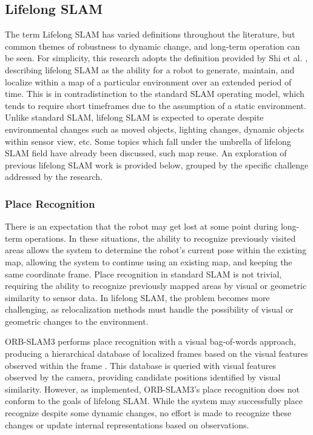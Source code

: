 \subsection{Lifelong SLAM}

The term Lifelong SLAM has varied definitions throughout the literature, but common themes of robustness to dynamic change, and long-term operation can be seen. For simplicity, this research adopts the definition provided by Shi et al. \cite{shiAreWeReady2020}, describing lifelong SLAM as the ability for a robot to generate, maintain, and localize within a map of a particular environment over an extended period of time. This is in contradistinction to the standard SLAM operating model, which tends to require short timeframes due to the assumption of a static environment. Unlike standard SLAM, lifelong SLAM is expected to operate despite environmental changes such as moved objects, lighting changes, dynamic objects within sensor view, etc. Some topics which fall under the umbrella of lifelong SLAM field have already been discussed, such map reuse. An exploration of previous lifelong SLAM work is provided below, grouped by the specific challenge addressed by the research.

\subsubsection{Place Recognition}

There is an expectation that the robot may get lost at some point during long-term operations. In these situations, the ability to recognize previously visited areas allows the system to determine the robot's current pose within the existing map, allowing the system to continue using an existing map, and keeping the same coordinate frame. Place recognition in standard SLAM is not trivial, requiring the ability to recognize previously mapped areas by visual or geometric similarity to sensor data. In lifelong SLAM, the problem becomes more challenging, as relocalization methods must handle the possibility of visual or geometric changes to the environment.

ORB-SLAM3 performs place recognition with a visual bag-of-words approach, producing a hierarchical database of localized frames based on the visual features observed within the frame \cite{camposORBSLAM3AccurateOpenSource2021}\cite{galvez-lopezBagsBinaryWords2012}. This database is queried with visual features observed by the camera, providing candidate positions identified by visual similarity. However, as implemented, ORB-SLAM3's place recognition does not conform to the goals of lifelong SLAM. While the system may successfully place recognize despite some dynamic changes, no effort is made to recognize these changes or update internal representations based on observations.



